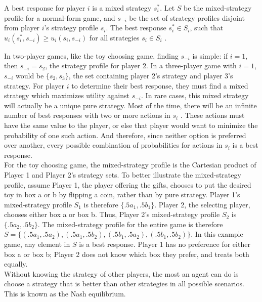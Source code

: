\begin{define}
  A best response for player $i$ is a mixed strategy $s_i^*$. Let $S$ be the mixed-strategy profile for a normal-form game, and $s_{-i}$ be the set of strategy profiles disjoint from player $i$'s strategy profile $s_i$. The best response $s_i^*\in S_i$, such that $u_i(s_i^*,s_{-i}) \ge u_i(s_i, s_{-i})$ for all strategies $s_i\in S_i$ \cite{shoh09}.
\end{define}

In two-player games, like the toy choosing game, finding $s_{-i}$ is simple: if $i=1$, then $s_{-i}=s_2$, the strategy profile for player 2. In a three-player game with $i=1$, $s_{-i}$ would be $\{s_2, s_3\}$, the set containing player 2's strategy and player 3's strategy. For player $i$ to determine their best response, they must find a mixed strategy which maximizes utility against $s_{-i}$. In rare cases, this mixed strategy will actually be a unique pure strategy. Most of the time, there will be an infinite number of best responses with two or more actions in $s_i$ \cite{shoh09}. These actions must have the same value to the player, or else that player would want to minimize the probability of one such action. And therefore, since neither option is preferred over another, every possible combination of probabilities for actions in $s_i$ is a best response.\\

For the toy choosing game, the mixed-strategy profile is the Cartesian product of Player 1 and Player 2's strategy sets. To better illustrate the mixed-strategy profile, assume Player 1, the player offering the gifts, chooses to put the desired toy in box a or b by flipping a coin, rather than by pure strategy. Player 1's mixed-strategy profile $S_1$ is therefore $\{.5a_1, .5b_1\}$. Player 2, the selecting player, chooses either box a or box b. Thus, Player 2's mixed-strategy profile $S_2$ is $\{.5a_2, .5b_2\}$. The mixed-strategy profile for the entire game is therefore $S=\{(.5a_1, .5a_2), (.5a_1, .5b_2), (.5b_1, .5a_2), (.5b_1, .5b_2)\}$. In this example game, any element in $S$ is a best response. Player 1 has no preference for either box a or box b; Player 2 does not know which box they prefer, and treats both equally.\\

Without knowing the strategy of other players, the most an agent can do is choose a strategy that is better than other strategies in all possible scenarios. This is known as the Nash equilibrium.

